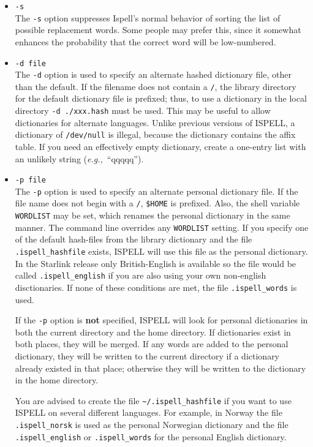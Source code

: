 \documentclass[twoside,11pt]{article}
\begin{document}
\begin{itemize}
\item {\Large\tt -s}\\
The \verb+-s+ option suppresses Ispell's normal behavior of sorting the list
of possible replacement words.
Some people may prefer this, since it somewhat enhances the probability that
the correct word will be low-numbered.

\item {\Large\tt -d file}\\
The \verb+-d+ option is used to specify an alternate hashed dictionary file,
other than the default.
If the filename does not contain a \verb+/+, the library directory for the
default dictionary file is prefixed; thus, to use a dictionary in the local
directory \verb+-d ./xxx.hash+ must be used.
This may be useful to allow dictionaries for alternate languages.
Unlike previous versions of ISPELL, a dictionary of \verb+/dev/null+ is illegal,
because the dictionary contains the affix table.
If you need an effectively empty dictionary, create a one-entry list with an
unlikely string ({\it{e.g.,}}~``qqqqq'').

\item {\Large\tt -p file}\\
The \verb+-p+ option is used to specify an alternate personal dictionary file.
If the file name does not begin with a \verb+/+, \verb+$HOME+ is prefixed.
Also, the shell variable \verb+WORDLIST+ may be set, which renames the personal
dictionary in the same manner.
The command line overrides any \verb+WORDLIST+ setting.
If you specify one of the default hash-files from the library dictionary and the
file \verb+.ispell_hashfile+ exists, ISPELL will use this file as the personal
dictionary.
In the Starlink release only British-English is available so the file would be
called \verb+.ispell_english+ if you are also using your own non-english
disctionaries.
If none of these conditions are met, the file \verb+.ispell_words+ is used.

If the \verb+-p+ option is {\bf not} specified, ISPELL will look for personal
dictionaries in both the current directory and the home directory.
If dictionaries exist in both places, they will be merged.
If any words are added to the personal dictionary, they will be written to the
current directory if a dictionary already existed in that place; otherwise they
will be written to the dictionary in the home directory.

You are advised to create the file \verb+~/.ispell_hashfile+ if you want to use
ISPELL on several different languages.
For example, in Norway the file \verb+.ispell_norsk+ is used as the personal
Norwegian dictionary and the file \verb+.ispell_english+ or
\verb+.ispell_words+ for the personal English dictionary.


\end{itemize}
\end{document}
